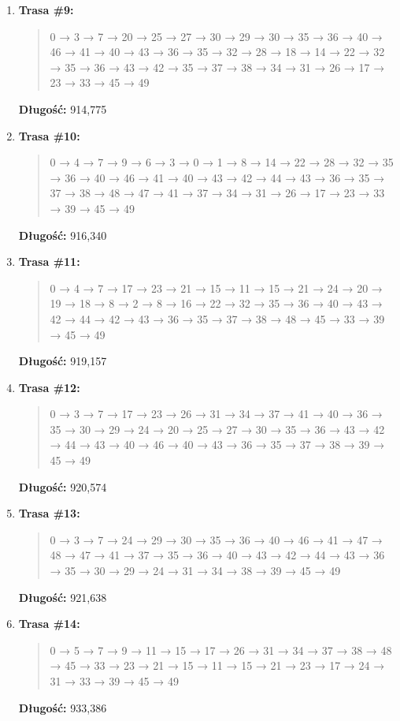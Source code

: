 \documentclass{article}
\begin{document}
\begin{enumerate}
    \item \textbf{Trasa \#9:}
    \begin{quote}
        0 → 3 → 7 → 20 → 25 → 27 → 30 → 29 → 30 → 35 → 36 → 40 → 46 → 41 → 40 → 43 → 36 → 35 → 32 → 28 → 18 → 14 → 22 → 32 → 35 → 36 → 43 → 42 → 35 → 37 → 38 → 34 → 31 → 26 → 17 → 23 → 33 → 45 → 49
    \end{quote}
    \textbf{Długość:} 914{,}775

    \item \textbf{Trasa \#10:}
    \begin{quote}
        0 → 4 → 7 → 9 → 6 → 3 → 0 → 1 → 8 → 14 → 22 → 28 → 32 → 35 → 36 → 40 → 46 → 41 → 40 → 43 → 42 → 44 → 43 → 36 → 35 → 37 → 38 → 48 → 47 → 41 → 37 → 34 → 31 → 26 → 17 → 23 → 33 → 39 → 45 → 49
    \end{quote}
    \textbf{Długość:} 916{,}340

    \item \textbf{Trasa \#11:}
    \begin{quote}
        0 → 4 → 7 → 17 → 23 → 21 → 15 → 11 → 15 → 21 → 24 → 20 → 19 → 18 → 8 → 2 → 8 → 16 → 22 → 32 → 35 → 36 → 40 → 43 → 42 → 44 → 42 → 43 → 36 → 35 → 37 → 38 → 48 → 45 → 33 → 39 → 45 → 49
    \end{quote}
    \textbf{Długość:} 919{,}157

    \item \textbf{Trasa \#12:}
    \begin{quote}
        0 → 3 → 7 → 17 → 23 → 26 → 31 → 34 → 37 → 41 → 40 → 36 → 35 → 30 → 29 → 24 → 20 → 25 → 27 → 30 → 35 → 36 → 43 → 42 → 44 → 43 → 40 → 46 → 40 → 43 → 36 → 35 → 37 → 38 → 39 → 45 → 49
    \end{quote}
    \textbf{Długość:} 920{,}574

    \item \textbf{Trasa \#13:}
    \begin{quote}
        0 → 3 → 7 → 24 → 29 → 30 → 35 → 36 → 40 → 46 → 41 → 47 → 48 → 47 → 41 → 37 → 35 → 36 → 40 → 43 → 42 → 44 → 43 → 36 → 35 → 30 → 29 → 24 → 31 → 34 → 38 → 39 → 45 → 49
    \end{quote}
    \textbf{Długość:} 921{,}638

    \item \textbf{Trasa \#14:}
    \begin{quote}
        0 → 5 → 7 → 9 → 11 → 15 → 17 → 26 → 31 → 34 → 37 → 38 → 48 → 45 → 33 → 23 → 21 → 15 → 11 → 15 → 21 → 23 → 17 → 24 → 31 → 33 → 39 → 45 → 49
    \end{quote}
    \textbf{Długość:} 933{,}386


\end{enumerate}
\end{document}
